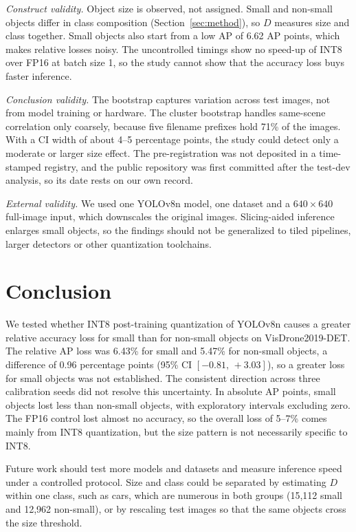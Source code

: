 \documentclass[conference]{IEEEtran}
\begin{document}
\emph{Construct validity.} Object size is observed, not assigned. Small and non-small objects
differ in class composition (Section~\ref{sec:method}), so $D$ measures size and class together.
Small objects also start from a low AP of 6.62 AP points, which makes relative losses noisy. The
uncontrolled
timings show no speed-up of INT8 over FP16 at batch size 1, so the study cannot show
that the accuracy loss buys faster inference.

\emph{Conclusion validity.} The bootstrap captures variation across test images, not from model
training or hardware. The cluster bootstrap handles same-scene correlation only coarsely, because
five filename prefixes hold 71\% of the images. With a CI width of about 4--5 percentage points,
the study could detect only a moderate or larger size effect. The pre-registration was not deposited in a
time-stamped registry, and the public repository was first committed after the test-dev analysis,
so its date rests on our own record.

\emph{External validity.} We used one YOLOv8n model, one dataset and a $640\times640$ full-image
input, which downscales the original images. Slicing-aided inference~\cite{akyon2022sahi}
enlarges small objects, so the findings should not be generalized to tiled pipelines, larger
detectors or other quantization toolchains.

\section{Conclusion}
\label{sec:conclusion}

We tested whether INT8 post-training quantization of YOLOv8n causes a greater relative accuracy
loss for small than for non-small objects on VisDrone2019-DET. The relative AP loss was 6.43\%
for small and 5.47\% for non-small objects, a difference of 0.96 percentage points (95\% CI
$[-0.81,\,+3.03]$), so a greater loss for small objects was not established. The consistent
direction across three calibration seeds did not resolve this uncertainty. In absolute
AP points, small objects lost less than non-small objects, with exploratory intervals excluding
zero. The FP16 control lost
almost no accuracy, so the overall loss of 5--7\% comes mainly from INT8 quantization, but the size
pattern is not necessarily specific to INT8.

Future work should test more models and datasets and measure inference speed under a controlled
protocol. Size and class could be separated by estimating $D$ within one class, such as cars,
which are numerous in both groups (15,112 small and 12,962 non-small), or by rescaling test
images so that the same objects cross the size threshold.
\end{document}
